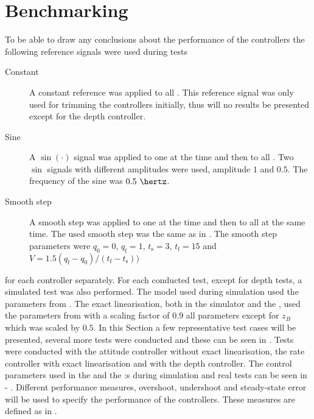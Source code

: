 \section{Benchmarking}
To be able to draw any conclusions about the performance of the controllers the following reference signals were used during tests
\begin{description}
\item[Constant] A constant reference was applied to all \abbrDOF. This reference signal was only used for trimming the controllers initially, thus will no results be presented except for the depth controller.

\item[Sine] A $\sin(\cdot)$ signal was applied to one \abbrDOF at the time and then to all \abbrDOF. Two $\sin$ signals with different amplitudes were used, amplitude $1$ and $0.5$. The frequency of the sine was $0.5\ \hertz$.

\item[Smooth step] A smooth step was applied to one \abbrDOF at the time and then to all \abbrDOF at the same time. The used smooth step was the same as in \citet[p. 192]{robotics}. The smooth step parameters were $q_{\text{0}} = 0$, $q_{\text{f}} = 1$, $t_{\text{s}} = 3$, $t_{\text{f}} = 15$ and $V = 1.5 (q_{\text{f}} - q_{\text{0}})/(t_{\text{f}} - t_{\text{s}}))$
\end{description}
for each controller separately. For each conducted test, except for depth tests, a simulated test was also performed. The \abbrROV model used during simulation used the parameters from . The exact linearisation, both in the simulator and the \abbrROV, used the parameters from  with a scaling factor of $0.9$ all parameters except for $z_B$ which was scaled by $0.5$. In this Section a few representative test cases will be presented, several more tests were conducted and these can be seen in . 
Tests were conducted with the \abbrPID attitude controller without exact linearisation, the \abbrPI rate controller with exact linearisation and with the \abbrPI depth controller. The control parameters used in the \abbrPID and the \abbrPI:s during simulation and real tests can be seen in  - . Different performance measures, overshoot, undershoot and steady-state error will be used to specify the performance of the controllers. These measures are defined as in \citet{reglerteori}. 

